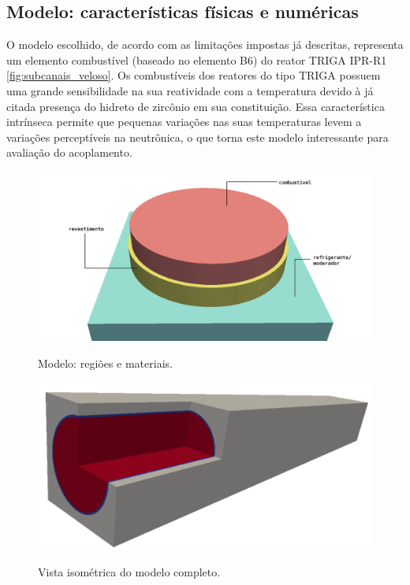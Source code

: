 


\subsection{Modelo: características físicas e numéricas}
\label{ssec:mod_fis_num}

O modelo escolhido, de acordo com as limitações impostas já descritas,
representa um elemento combustível (baseado no elemento B6) do reator TRIGA IPR-R1 \ref{fig:subcanais_veloso}.
Os combustíveis dos reatores do tipo TRIGA
possuem uma grande sensibilidade na sua
reatividade com a temperatura devido à já citada presença do hidreto de zircônio
em sua constituição. Essa característica intrínseca permite que pequenas
variações nas suas temperaturas levem a variações perceptíveis na neutrônica,
o que torna este modelo interessante para avaliação do acoplamento.


\begin{figure}[htb]
  \caption{Modelo: regiões e materiais.}%
  \centering\includegraphics[scale=0.5]{figuras/regioes_surface2.png}
  \label{fig:regions}
\end{figure}

\begin{figure}[htb]
  \caption{Vista isométrica do modelo completo.}
  \centering\includegraphics[scale=0.5]{figuras/all_regions_isometric.png}
  \label{fig:region_isometric}
\end{figure}

